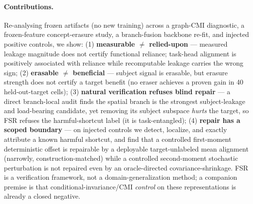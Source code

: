 \paragraph{Contributions.} Re-analysing frozen artifacts (no new training) across a graph-CMI
diagnostic, a frozen-feature concept-erasure study, a branch-fusion backbone re-fit, and injected
positive controls, we show:
(1) \textbf{measurable $\neq$ relied-upon} --- measured leakage magnitude does not certify functional
reliance; task-head alignment is positively associated with reliance while recomputable leakage carries
the wrong sign;
(2) \textbf{erasable $\neq$ beneficial} --- subject signal is erasable, but erasure strength does not
certify a target benefit (no eraser achieves a proven gain in 40 held-out-target cells);
(3) \textbf{natural verification refuses blind repair} --- a direct branch-local audit finds the spatial
branch is the strongest subject-leakage and load-bearing candidate, yet removing its subject subspace
\emph{hurts} the target, so FSR refuses the harmful-shortcut label (it is task-entangled);
(4) \textbf{repair has a scoped boundary} --- on injected controls we detect, localize, and exactly
attribute a known harmful shortcut, and find that a controlled first-moment deterministic offset is
repairable by a deployable target-unlabeled mean alignment (narrowly, construction-matched) while a
controlled second-moment stochastic perturbation is not repaired even by an oracle-directed
covariance-shrinkage.
FSR is a verification framework, not a domain-generalization method; a companion premise is that
conditional-invariance/CMI \emph{control} on these representations is already a closed negative.
